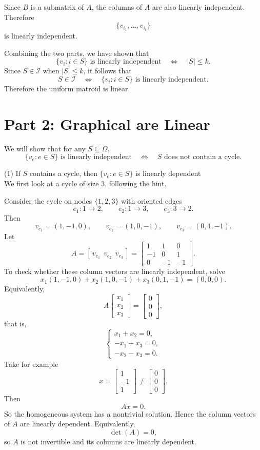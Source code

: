 \documentclass[11pt]{article}
\begin{document}
Since \(B\) is a submatrix of \(A\), the columns of \(A\) are also linearly independent. Therefore
\[
\{v_{i_1},\dots,v_{i_t}\}
\]
is linearly independent.

\medskip
Combining the two parts, we have shown that
\[
\{v_i:i\in S\}\text{ is linearly independent}
\quad \Longleftrightarrow \quad
|S|\le k.
\]
Since \(S\in\mathcal I\) when \(|S|\le k\), it follows that
\[
S\in\mathcal I
\quad \Longleftrightarrow \quad
\{v_i:i\in S\}\text{ is linearly independent}.
\]
Therefore the uniform matroid is linear.



\section*{Part 2: Graphical are Linear}
We will show that for any $S\subseteq \Omega$,
\[
\{v_e:e\in S\}\text{ is linearly independent}
\quad\Longleftrightarrow\quad
S\text{ does not contain a cycle}.
\]

\noindent (1) If $S$ contains a cycle, then $\{v_e:e\in S\}$ is linearly dependent
\\
We first look at a cycle of size $3$, following the hint.

Consider the cycle on nodes $\{1,2,3\}$ with oriented edges
\[
e_1:1\to 2,\qquad e_2:1\to 3,\qquad e_3:3\to 2.
\]
Then
\[
v_{e_1}=(1,-1,0),\qquad
v_{e_2}=(1,0,-1),\qquad
v_{e_3}=(0,1,-1).
\]
Let
\[
A=[\,v_{e_1}\ \ v_{e_2}\ \ v_{e_3}\,]
=
\begin{bmatrix}
1&1&0\\
-1&0&1\\
0&-1&-1
\end{bmatrix}.
\]
To check whether these column vectors are linearly independent, solve
\[
x_1(1,-1,0)+x_2(1,0,-1)+x_3(0,1,-1)=(0,0,0).
\]
Equivalently,
\[
A
\begin{bmatrix}
x_1\\x_2\\x_3
\end{bmatrix}
=
\begin{bmatrix}
0\\0\\0
\end{bmatrix},
\]
that is,
\[
\begin{cases}
x_1+x_2=0,\\
-x_1+x_3=0,\\
-x_2-x_3=0.
\end{cases}
\]
Take for example
\[
x=
\begin{bmatrix}
1\\-1\\1
\end{bmatrix}\neq
\begin{bmatrix}
0\\0\\0
\end{bmatrix}.
\]
Then
\[
A x=0.
\]
So the homogeneous system has a nontrivial solution. Hence the column vectors of $A$ are linearly dependent. Equivalently,
\[
\det(A)=0,
\]
so $A$ is not invertible and its columns are linearly dependent.
\end{document}
